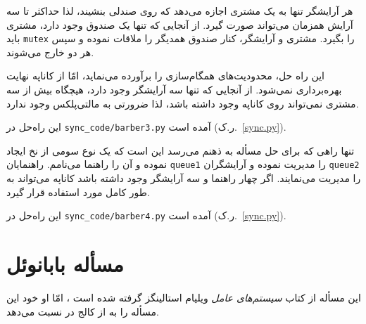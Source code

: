 \documentclass{book}
\newcommand{\clearemptydoublepage}{\newpage\cleardoublepage}
\begin{document}
    هر آرایشگر تنها به یک مشتری اجازه می‌دهد که روی صندلی بنشیند، لذا حداکثر تا سه آرایش همزمان می‌تواند صورت گیرد. از آنجایی که تنها یک صندوق وجود 
    دارد، مشتری باید  {\tt mutex} را بگیرد. مشتری و آرایشگر، کنار صندوق همدیگر را ملاقات نموده و سپس هر دو خارج می‌شوند. 

    این راه حل،‌ محدودیت‌های همگام‌سازی را برآورده می‌نماید،‌ امّا از کاناپه نهایت بهره‌برداری نمی‌شود. 
    از آنجایی که تنها سه آرایشگر وجود دارد، هیچگاه بیش از سه مشتری نمی‌تواند روی کاناپه وجود داشته باشد، لذا ضرورتی به مالتی‌پلکس وجود ندارد. 

    این راه‌حل در \verb"sync_code/barber3.py" آمده است (ر.ک.~\ref{sync.py}).


    تنها راهی که برای حل مسأله به ذهنم می‌رسد این است که یک نوع سومی از نخ ایجاد نموده و آن را راهنما می‌نامم. 
    راهنمایان {\tt queue1} را مدیریت نموده و آرایشگران {\tt queue2} را مدیریت می‌نمایند. اگر چهار راهنما و سه آرایشگر وجود داشته باشد 
    کاناپه می‌تواند به طور کامل مورد استفاده قرار گیرد. 

    این راه‌حل در \verb"sync_code/barber4.py" آمده است (ر.ک.~\ref{sync.py}).


\clearemptydoublepage
\section{مسأله بابانوئل}

    این مسأله از کتاب \emph{سیستم‌های عامل} ویلیام استالینگز گرفته شده است  \cite{stallings}، امّا او خود این مسأله را به 
    از کالج   در  نسبت می‌دهد. 

\end{document}

